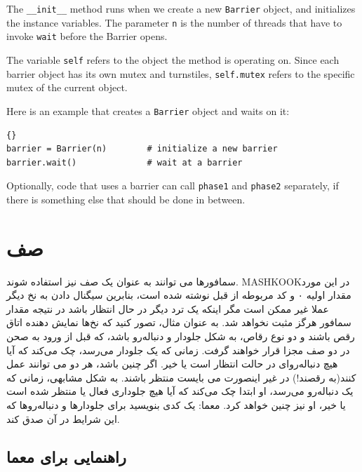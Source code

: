 \documentclass{book}
\newcommand{\clearemptydoublepage}{\newpage\cleardoublepage}
\begin{document}
The {\tt \_\_init\_\_} method runs when we create a new
{\tt Barrier} object, and initializes the instance variables.
The parameter {\tt n} is the number of threads that have
to invoke {\tt wait} before the Barrier opens.

The variable {\tt self} refers to the object the method
is operating on.  Since each barrier object has its own
mutex and turnstiles, {\tt self.mutex} refers to the specific
mutex of the current object.

Here is an example that creates a {\tt Barrier}
object and waits on it:

\begin{latin}
\begin{latin}
\begin{lstlisting}[title={Barrier interface}]{}
barrier = Barrier(n)        # initialize a new barrier
barrier.wait()              # wait at a barrier
\end{lstlisting}
\end{latin}
\end{latin}

Optionally, code that uses a barrier can call {\tt phase1} and
{\tt phase2} separately, if there is something else that
should be done in between.



\section{صف}
\label{dancers}

سمافور‌ها می توانند به عنوان یک صف نیز استفاده شوند. {MASHKOOK}در این مورد مقدار اولیه ۰ و کد مربوطه از قبل نوشته شده است، بنابرین سیگنال دادن به نخ دیگر عملا غیر ممکن است مگر اینکه یک ترد دیگر در حال انتظار باشد در نتیجه مقدار سمافور هرگز مثبت نخواهد شد.
به عنوان مثال، تصور کنید که نخ‌ها نمایش دهنده اتاق رقص باشند و دو نوع رقاص، به شکل جلودار و دنباله‌رو باشد، که قبل از ورود به صحن در دو صف مجزا قرار خواهند گرفت. زمانی که یک جلودار می‌رسد، چک می‌کند که آیا هیچ دنباله‌رو‌ای در حالت انتظار است یا خیر. اگر چنین باشد، هر دو می توانند عمل کنند(به رقصند!) در غیر اینصورت می بایست منتظر باشند.
به شکل مشابهی، زمانی که یک دنباله‌رو می‌رسد، او ابتدا چک می‌کند که آیا هیچ جلو‌داری فعال یا منتظر شده است یا خیر، او نیز چنین خواهد کرد.
معما: یک کدی بنویسید برای جلو‌دارها و دنباله‌رو‌ها که این شرایط در آن صدق کند.


\clearemptydoublepage
\subsection {راهنمایی برای معما}
\end{document}
